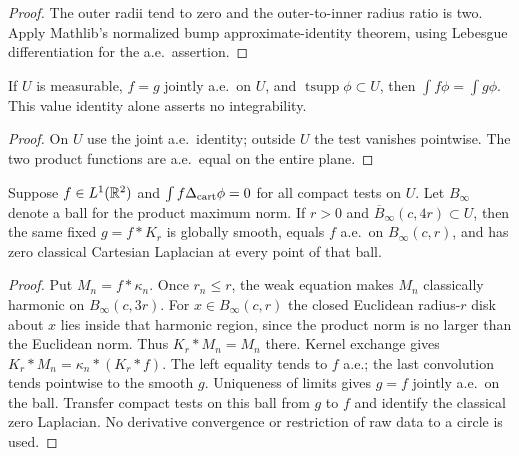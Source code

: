 \begin{proof}
\leanok
The outer radii tend to zero and the outer-to-inner radius ratio is two.
Apply Mathlib's normalized bump approximate-identity theorem,
using Lebesgue differentiation for the a.e.\ assertion.
\end{proof}

\begin{lemma}
\label{lem:joint-ae-compact-test}
\leanok
If $U$ is measurable, $f=g$ jointly a.e.\ on $U$, and
$\operatorname{tsupp}\phi\subset U$, then $\int f\phi=\int g\phi$.
This value identity alone asserts no integrability.
\end{lemma}

\begin{proof}
\leanok
On $U$ use the joint a.e.\ identity; outside $U$ the test vanishes pointwise.
The two product functions are a.e.\ equal on the entire plane.
\end{proof}

\begin{lemma}
\label{lem:weak-harmonic-local-smoothing}
\leanok
Suppose $f\in L^1(\mathbb{R}^2)$ and
$\int f\Delta_{\rm cart}\phi=0$ for all compact tests on $U$.
Let $B_\infty$ denote a ball for the product maximum norm.
If $r>0$ and $\overline B_\infty(c,4r)\subset U$, then the same fixed
$g=f*K_r$ is globally smooth, equals $f$ a.e.\ on $B_\infty(c,r)$,
and has zero classical Cartesian Laplacian at every point of that ball.
\end{lemma}

\begin{proof}
\leanok
Put $M_n=f*\kappa_n$. Once $r_n\le r$, the weak equation makes $M_n$
classically harmonic on $B_\infty(c,3r)$.
For $x\in B_\infty(c,r)$ the closed Euclidean radius-$r$ disk about $x$
lies inside that harmonic region, since the product norm is no larger
than the Euclidean norm.
Thus $K_r*M_n=M_n$ there.
Kernel exchange gives $K_r*M_n=\kappa_n*(K_r*f)$.
The left equality tends to $f$ a.e.; the last convolution tends pointwise
to the smooth $g$. Uniqueness of limits gives $g=f$ jointly a.e.\ on the ball.
Transfer compact tests on this ball from $g$ to $f$ and identify the
classical zero Laplacian. No derivative convergence or restriction of raw
data to a circle is used.
\end{proof}

